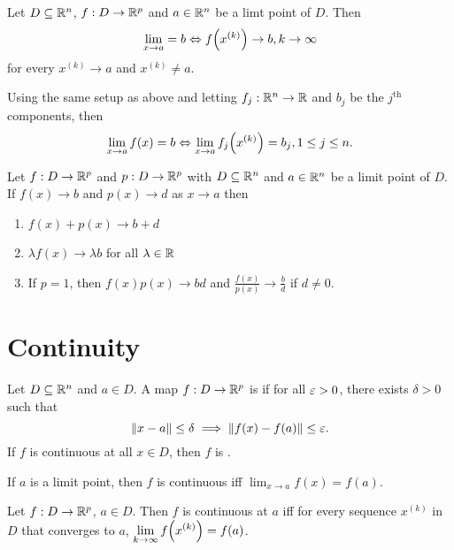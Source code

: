 \documentclass[../main.tex]{subfiles}
\begin{document}
\begin{theorem}
    Let $D \subseteq \mathbb{R}^n$, $f : D \to \mathbb{R}^p$ and $a \in \mathbb{R}^n$ be a limt point of $D$. Then
    \[
        \lim_{x \to a} = b \Leftrightarrow f\qty(x^{(k)}) \to b, k \to \infty
    \]
    for every $x^{(k)} \to a$ and $x^{(k)} \neq a$.
\end{theorem}

\begin{corollary}
    Using the same setup as above and letting $f_j: \mathbb{R}^n \to \mathbb{R}$ and $b_j$ be the $j^\text{th}$ components, then
    \[
        \lim_{x \to a} f(x) = b \Leftrightarrow \lim_{x\to a} f_{j}\qty(x^{(k)}) = b_j, 1 \leq j \leq n
    .\]
\end{corollary}

\begin{corollary}
    Let $f : D \to \mathbb{R}^p$ and $p : D \to \mathbb{R}^p$ with $D \subseteq \mathbb{R}^n$ and $a \in \mathbb{R}^n$ be a limit point of $D$. If $f(x) \to b$ and $p(x) \to d$ as $x \to a$ then
    \begin{enumerate}
        \item $f(x) + p(x) \to b + d$
        \item $\lambda f(x) \to \lambda b$ for all $\lambda \in \mathbb{R}$
        \item If $p = 1$, then $f(x)p(x) \to bd$ and $\frac{f(x)}{p(x)} \to \frac{b}{d}$ if $d \neq 0$.
    \end{enumerate}
\end{corollary}

\section{Continuity}

\begin{definition}[Continuity]
    Let $D \subseteq \mathbb{R}^n$ and $a \in D$. A map $f : D \to \mathbb{R}^p$ is  if for all $\varepsilon > 0$, there exists $\delta > 0$ such that
    \[
        \norm{x - a} \leq \delta \implies \norm{f(x) - f(a)} \leq \varepsilon
    .\]
    If $f$ is continuous at all $x \in D$, then $f$ is .
\end{definition}

\begin{remark}
    If $a$ is a limit point, then $f$ is continuous iff $\displaystyle\lim_{x \to a} f(x) = f(a)$.
\end{remark}

\begin{theorem}
    Let $f : D \to \mathbb{R}^p$, $a \in D$. Then $f$ is continuous at $a$ iff for every sequence $x^{(k)}$ in $D$ that converges to $a$, $\displaystyle\lim_{k\to \infty} f\qty(x^{(k)}) = f(a)$.
\end{theorem}
\end{document}
